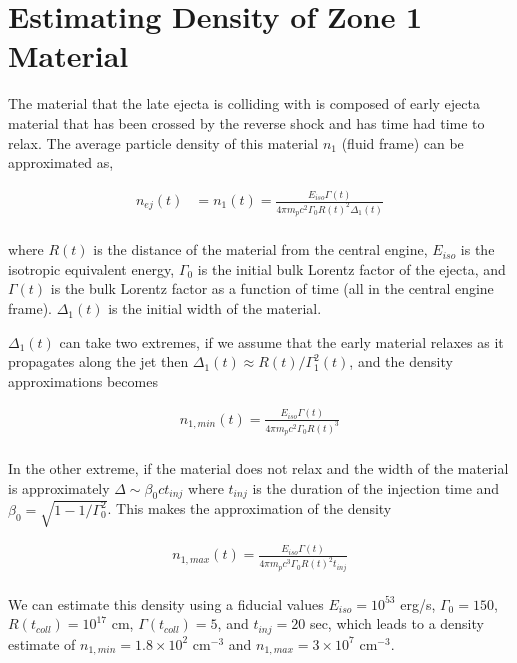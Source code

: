 \documentclass[linenumbers,twocolumn]{aastex631}
\begin{document}
\section{Estimating Density of Zone 1 Material}
{
    The material that the late ejecta is colliding with is composed of early ejecta material that has been crossed by the reverse shock and has time had time to relax. The average particle density of this material $n_1$ (fluid frame) can be approximated as,

    \begin{align}
        n_{ej}(t) &= n_{1}(t) = \frac{E_{iso}\Gamma(t)}{4\pi m_p c^2 \Gamma_0 R(t)^2 \Delta_1(t)} \label{eq: dens estim} \\
    \end{align}

    where $R(t)$ is the distance of the material from the central engine, $E_{iso}$ is the isotropic equivalent energy, $\Gamma_0$ is the initial bulk Lorentz factor of the ejecta, and $\Gamma(t)$ is the bulk Lorentz factor as a function of time (all in the central engine frame). $\Delta_1(t)$ is the initial width of the material. 

    $\Delta_1(t)$ can take two extremes, if we assume that the early material relaxes as it propagates along the jet then $\Delta_1(t) \approx R(t)/\Gamma_1^2(t)$, and the density approximations becomes

    \begin{align}
        n_{1,min}(t) = \frac{E_{iso}\Gamma(t)}{4\pi m_p c^2 \Gamma_0 R(t)^3} \label{eq: dens estim min} \\
    \end{align}

    In the other extreme, if the material does not relax and the width of the material is approximately $\Delta \sim \beta_0 ct_{inj}$ where $t_{inj}$ is the duration of the injection time and $\beta_0 = \sqrt{1 - 1/\Gamma_0^2}$. This makes the approximation of the density 

    \begin{align}
        n_{1,max}(t) = \frac{E_{iso}\Gamma(t)}{4\pi m_p c^3 \Gamma_0 R(t)^2 t_{inj}} \label{eq: dens estim max} \\
    \end{align}

    We can estimate this density using a fiducial values $E_{iso} = 10^{53}$ erg/s, $\Gamma_0 = 150$, $R(t_{coll}) = 10^{17}$ cm, $\Gamma (t_{coll}) = 5$, and $t_{inj} = 20$ sec, which leads to a density estimate of $n_{1,min}=1.8\times10^{2}$ cm$^{-3}$ and $n_{1,max} = 3 \times 10^{7}$ cm$^{-3}$.
}
\end{document}
